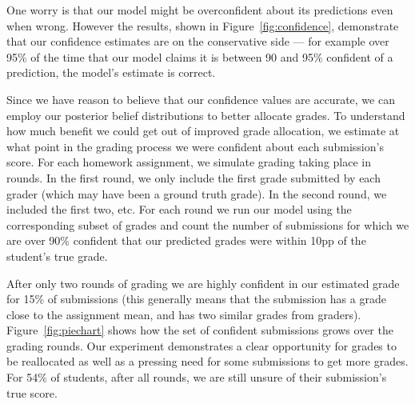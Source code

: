 One worry is that our model might be overconfident about
its predictions even when wrong. However the results, shown in Figure~\ref{fig:confidence}, demonstrate
that our confidence estimates are on the conservative side ---
for example over 95\% of the time that our model claims it is between 90 and 95\% confident of a prediction, the model's estimate is correct. 

Since we have reason to believe that our confidence values are accurate, we can employ our posterior belief distributions to better allocate grades.  To understand how much benefit we could get out of improved grade allocation, we estimate at what point in the grading process we were confident about each submission's score. For each homework assignment, we simulate grading taking place in rounds. In the first round, we only include the first grade submitted by each grader (which may have been a ground truth grade). In the second round, we included the first two, etc. For each round we run our model using the corresponding subset of grades and count the number of submissions  for which we are over 90\% confident that our predicted grades were within 10pp of the student's true grade. 

After only two rounds of grading we are highly confident in our estimated grade for 15\% of submissions (this generally means that the submission has a grade close to the assignment mean, and has two similar grades from graders). Figure~\ref{fig:piechart} shows how the set of confident submissions grows over the grading rounds. Our experiment demonstrates a clear opportunity for grades to be reallocated as well as a pressing need for some submissions to get more grades. For 54\% of students, after all rounds, we are still unsure of their submission's true score.

